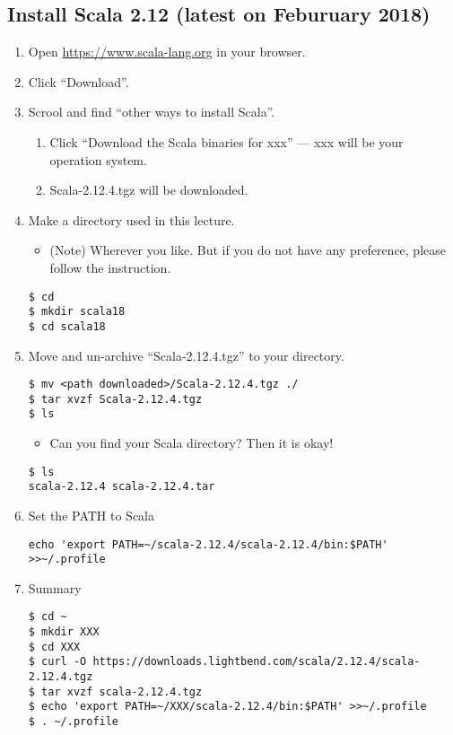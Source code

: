 \documentclass[11pt]{article}
\begin{document}
\subsection*{Install Scala 2.12 (latest on Feburuary 2018)}
\label{sec:orgheadline4}
\begin{enumerate}
\item Open \url{https://www.scala-lang.org} in your browser.
\item Click ``Download''.
\item Scrool and find ``other ways to install Scala''. 
\begin{enumerate}
\item Click ``Download the Scala binaries for xxx'' --- xxx will be
your operation system.
\item Scala-2.12.4.tgz will be downloaded.
\end{enumerate}
\item Make a directory used in this lecture.
\begin{itemize}
\item (Note) Wherever you like. But if you do not have any
preference, please follow the instruction.
\end{itemize}
\begin{verbatim}
$ cd
$ mkdir scala18
$ cd scala18
\end{verbatim}
\item Move and un-archive ``Scala-2.12.4.tgz'' to your directory. 
\begin{verbatim}
$ mv <path downloaded>/Scala-2.12.4.tgz ./
$ tar xvzf Scala-2.12.4.tgz
$ ls
\end{verbatim}
\begin{itemize}
\item Can you find your Scala directory? Then it is okay!
\end{itemize}
\begin{verbatim}
$ ls
scala-2.12.4 scala-2.12.4.tar
\end{verbatim}
\item Set the PATH to Scala
\begin{verbatim}
echo 'export PATH=~/scala-2.12.4/scala-2.12.4/bin:$PATH' >>~/.profile
\end{verbatim}

\item Summary
\begin{verbatim}
$ cd ~
$ mkdir XXX
$ cd XXX
$ curl -O https://downloads.lightbend.com/scala/2.12.4/scala-2.12.4.tgz
$ tar xvzf scala-2.12.4.tgz
$ echo 'export PATH=~/XXX/scala-2.12.4/bin:$PATH' >>~/.profile
$ . ~/.profile
\end{verbatim}
\end{enumerate}
\end{document}
